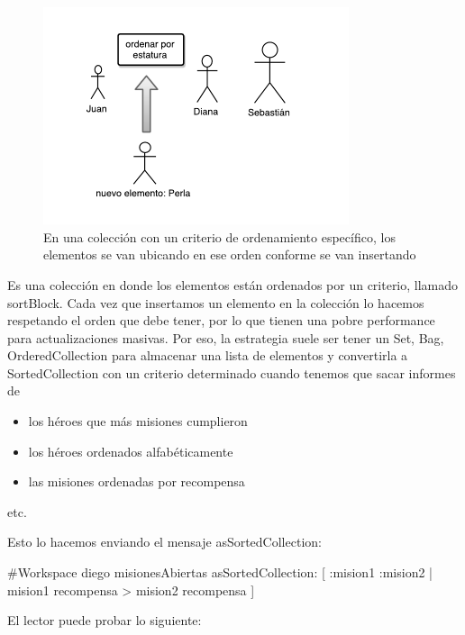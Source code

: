 \documentclass[a4paper,12pt]{book}
\begin{document}
\begin{figure}[h!]
    \centering
    \includegraphics[width=0.8\textwidth]{images/40_SortedCollection.pdf}
    \caption{En una colección con un criterio de ordenamiento específico, los elementos se van ubicando en ese orden
    conforme se van insertando}
\end{figure}
\FloatBarrier

Es una colección en donde los elementos están ordenados por un criterio, llamado sortBlock. Cada vez que
insertamos un elemento en la colección lo hacemos respetando el orden que debe tener, por lo que tienen
una pobre performance para actualizaciones masivas. Por eso, la estrategia suele ser tener un Set, Bag,
OrderedCollection para almacenar una lista de elementos y convertirla a SortedCollection con un criterio
determinado cuando tenemos que sacar informes de

\begin{itemize}
 \item los héroes que más misiones cumplieron
 \item los héroes ordenados alfabéticamente
 \item las misiones ordenadas por recompensa
\end{itemize}
etc. 

\vspace{\baselineskip}
Esto lo hacemos enviando el mensaje asSortedCollection:

\begin{code}
#Workspace
diego misionesAbiertas asSortedCollection: 
    [ :mision1 :mision2 | mision1 recompensa > mision2 recompensa ]
\end{code}

\vspace{\baselineskip}
El lector puede probar lo siguiente:
\end{document}
